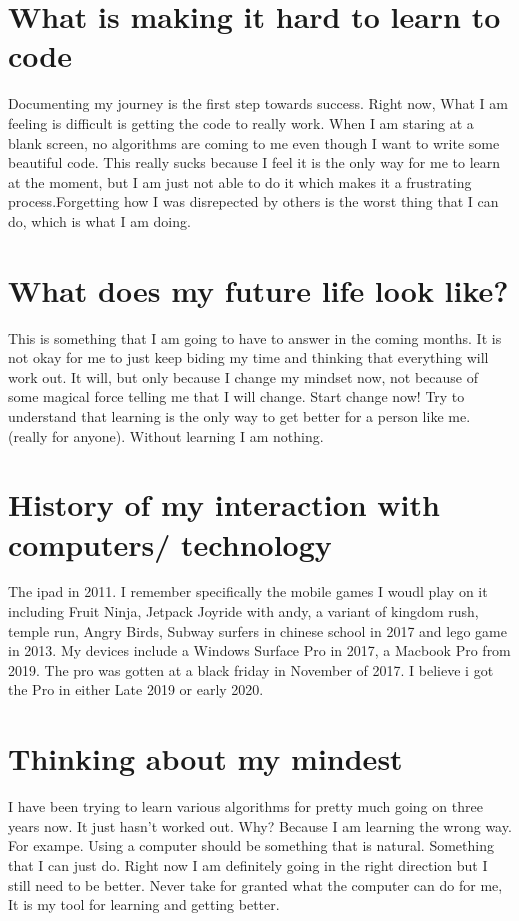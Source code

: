 \documentclass[12pt]{article}
\begin{document}
\section{What is making it hard to learn to code}
Documenting my journey is the first step towards success. Right now, What I am feeling is difficult is getting the code to really work. When I am staring at a blank screen, no algorithms are coming to me even though I want to write some beautiful code. This really sucks because I feel it is the only way for me to learn at the moment, but I am just not able to do it which makes it a frustrating process.Forgetting how I was disrepected by others is the worst thing that I can do, which is what I am doing. 

\section{What does my future life look like?}
This is something that I am going to have to answer in the coming months. It is not okay for me to just keep biding my time and thinking that everything will work out. It will, but only because I change my mindset now, not because of some magical force telling me that I will change. Start change now! Try to understand that learning is the only way to get better for a person like me. (really for anyone). Without learning I am nothing.
\section{History of my interaction with computers/ technology}
The ipad in 2011. I remember specifically the mobile games I woudl play on it including Fruit Ninja, Jetpack Joyride with andy, a variant of kingdom rush, temple run, Angry Birds, Subway surfers in chinese school in 2017 and lego game in 2013. My devices include a Windows Surface Pro in 2017, a Macbook Pro from 2019. The pro was gotten at a black friday in November of 2017. I believe i got the Pro in either Late 2019 or early 2020. 
\section{Thinking about my mindest}
I have been trying to learn various algorithms for pretty much going on three years now. It just hasn't worked out. Why? Because I am learning the wrong way. For exampe. Using a computer should be something that is natural. Something that I can just do. Right now I am definitely going in the right direction but I still need to be better. Never take for granted what the computer can do for me, It is my tool for learning and getting better. 
\end{document}
